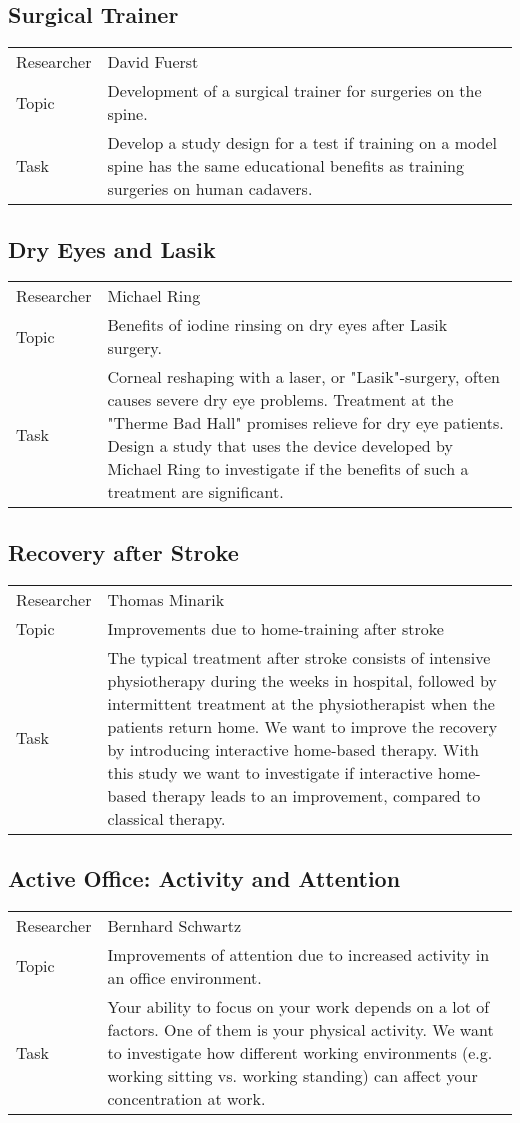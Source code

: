 \subsection{ Surgical Trainer }
\begin{tabular}{ l p{12cm} }
    Researcher & David Fuerst \\
    Topic &  Development of a surgical trainer for surgeries on the spine.\\
    Task &   Develop a study design for a test if training on a model spine has the same educational benefits as training surgeries on human cadavers.
\end{tabular}

\subsection{ Dry Eyes and Lasik }
\begin{tabular}{ l p{12cm} }
    Researcher & Michael Ring \\
    Topic &  Benefits of iodine rinsing on dry eyes after Lasik surgery.\\
    Task &   Corneal reshaping with a laser, or "Lasik"-surgery, often causes severe dry eye problems. Treatment at the "Therme Bad Hall" promises relieve for dry eye patients. Design a study that uses the device developed by Michael Ring to investigate if the benefits of such a treatment are significant.
\end{tabular}

\subsection{ Recovery after Stroke }
\begin{tabular}{ l p{12cm} }
    Researcher & Thomas Minarik \\
    Topic &  Improvements due to home-training after stroke \\
    Task &   The typical treatment after stroke consists of intensive physiotherapy during
    the weeks in hospital, followed by intermittent treatment at the physiotherapist when
    the patients return home. We want to improve the recovery by introducing interactive
    home-based therapy. With this study we want to investigate if interactive home-based
    therapy leads to an improvement, compared to classical therapy.
\end{tabular}

\subsection{ Active Office: Activity and Attention }
\begin{tabular}{ l p{12cm} }
    Researcher & Bernhard Schwartz \\
    Topic &  Improvements of attention due to increased activity in an office environment. \\
    Task &   Your ability to focus on your work depends on a lot of factors. One of them is your physical activity. We want to investigate how different working environments (e.g. working sitting vs. working standing) can affect your concentration at work.
\end{tabular}

